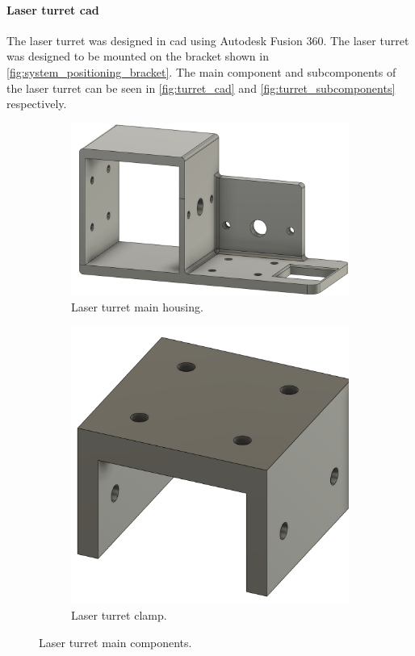 \paragraph{Laser turret \gls{cad}}
The laser turret was designed in \gls{cad} using Autodesk Fusion 360. The laser turret was designed to be mounted on the bracket shown in \autoref{fig:system_positioning_bracket}. The main component and subcomponents of the laser turret can be seen in \autoref{fig:turret_cad} and \autoref{fig:turret_subcomponents} respectively.
\begin{figure}[!htb]
  \centering
  \begin{subfigure}[t]{0.45\textwidth}
    \centering
    \includegraphics[width=\linewidth]{figures/hardware_design/turret_cad_90.png}
    \caption{Laser turret main housing.}
  \end{subfigure}
  \hfill
  \begin{subfigure}[t]{0.45\textwidth}
    \centering
    \includegraphics[width=0.55\linewidth]{figures/hardware_design/turret_clamp.png}
    \caption{Laser turret clamp.}
  \end{subfigure}
  \caption{Laser turret main components.}
  \label{fig:turret_cad}
\end{figure}
